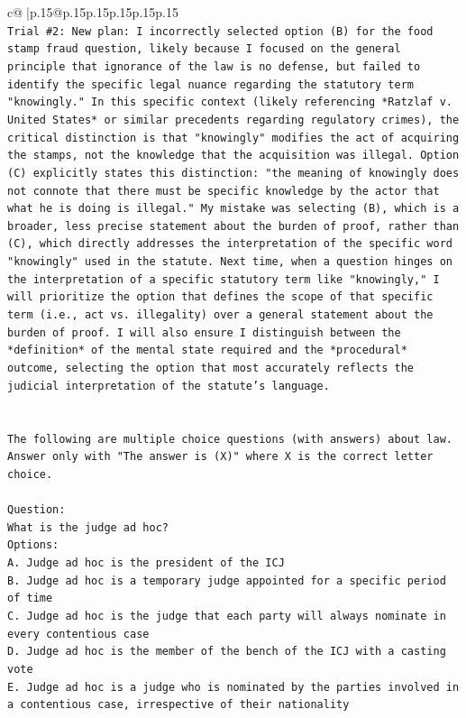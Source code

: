 \documentclass{article}
\begin{document}
{\begin{supertabular}{c@{$\;$}|p{.15\linewidth}@{}p{.15\linewidth}p{.15\linewidth}p{.15\linewidth}p{.15\linewidth}p{.15\linewidth}}
{{{\\ 
\texttt{Trial \#2: New plan: I incorrectly selected option (B) for the food stamp fraud question, likely because I focused on the general principle that ignorance of the law is no defense, but failed to identify the specific legal nuance regarding the statutory term "knowingly." In this specific context (likely referencing *Ratzlaf v. United States* or similar precedents regarding regulatory crimes), the critical distinction is that "knowingly" modifies the act of acquiring the stamps, not the knowledge that the acquisition was illegal. Option (C) explicitly states this distinction: "the meaning of knowingly does not connote that there must be specific knowledge by the actor that what he is doing is illegal." My mistake was selecting (B), which is a broader, less precise statement about the burden of proof, rather than (C), which directly addresses the interpretation of the specific word "knowingly" used in the statute. Next time, when a question hinges on the interpretation of a specific statutory term like "knowingly," I will prioritize the option that defines the scope of that specific term (i.e., act vs. illegality) over a general statement about the burden of proof. I will also ensure I distinguish between the *definition* of the mental state required and the *procedural* outcome, selecting the option that most accurately reflects the judicial interpretation of the statute's language.} \\
\\ 
\\ 
\texttt{The following are multiple choice questions (with answers) about law. Answer only with "The answer is (X)" where X is the correct letter choice.} \\
\\ 
\texttt{Question:} \\
\texttt{What is the judge ad hoc?} \\
\texttt{Options:} \\
\texttt{A. Judge ad hoc is the president of the ICJ} \\
\texttt{B. Judge ad hoc is a temporary judge appointed for a specific period of time} \\
\texttt{C. Judge ad hoc is the judge that each party will always nominate in every contentious case} \\
\texttt{D. Judge ad hoc is the member of the bench of the ICJ with a casting vote} \\
\texttt{E. Judge ad hoc is a judge who is nominated by the parties involved in a contentious case, irrespective of their nationality} \\
}}}
\end{supertabular}}
\end{document}
